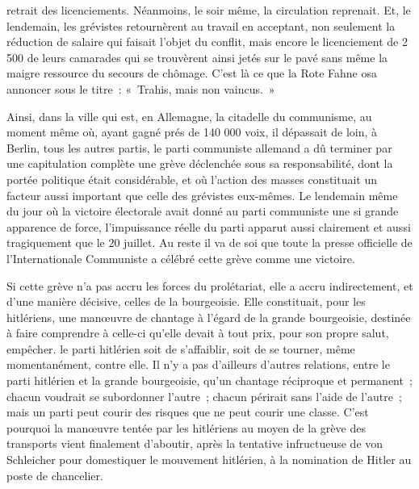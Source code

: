\documentclass[french,twoside]{book} %
\begin{document}
retrait des licenciements. Néanmoins, le soir même, la circulation reprenait. Et, le lendemain, les grévistes retournèrent au travail en acceptant, non seulement la réduction de salaire qui faisait l'objet du conflit, mais encore le licenciement de 2 500 de leurs camarades qui se trouvèrent ainsi jetés sur le pavé sans même la maigre ressource du secours de chômage. C'est là ce que la Rote Fahne osa annoncer sous le titre : « Trahis, mais non vaincus. »\par
Ainsi, dans la ville qui est, en Allemagne, la citadelle du communisme, au moment même où, ayant gagné prés de 140 000 voix, il dépassait de loin, à Berlin, tous les autres partis, le parti communiste allemand a dû terminer par une capitulation complète une grève déclenchée sous sa responsabilité, dont la portée politique était considérable, et où l'action des masses constituait un facteur aussi important que celle des grévistes eux-mêmes. Le lendemain même du jour où la victoire électorale avait donné au parti communiste une si grande apparence de force, l'impuissance réelle du parti apparut aussi claire­ment et aussi tragiquement que le 20 juillet. Au reste il va de soi que toute la presse officielle de l'Internationale Communiste a célébré cette grève comme une victoire.\par
Si cette grève n'a pas accru les forces du prolétariat, elle a accru indirec­tement, et d'une manière décisive, celles de la bourgeoisie. Elle constituait, pour les hitlériens, une manœuvre de chantage à l'égard de la grande bour­geoisie, destinée à faire comprendre à celle-ci qu'elle devait à tout prix, pour son propre salut, empêcher. le parti hitlérien soit de s'affaiblir, soit de se tourner, même momentanément, contre elle. Il n'y a pas d'ailleurs d'autres relations, entre le parti hitlérien et la grande bourgeoisie, qu'un chantage réciproque et permanent ; chacun voudrait se subordonner l'autre ; chacun périrait sans l'aide de l'autre ; mais un parti peut courir des risques que ne peut courir une classe. C'est pourquoi la manœuvre tentée par les hitlériens au moyen de la grève des transports vient finalement d'aboutir, après la tentative infructueuse de von Schleicher pour domestiquer le mouvement hitlérien, à la nomination de Hitler au poste de chancelier.\par
\end{document}
